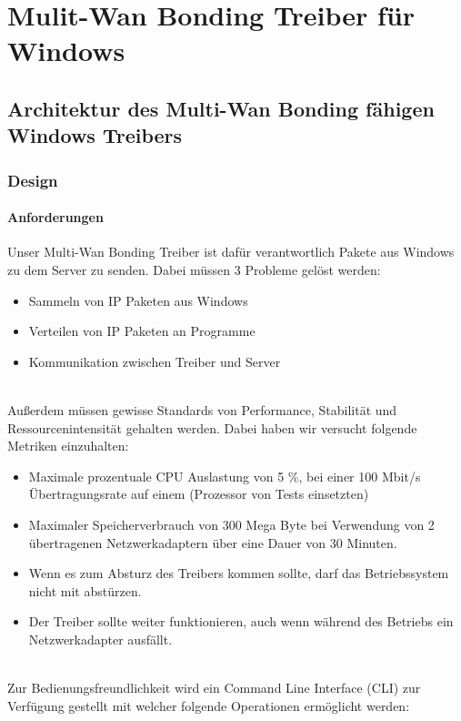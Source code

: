 \chapter{Mulit-Wan Bonding Treiber für Windows}
\label{chap:Treiber}

\section{Architektur des Multi-Wan Bonding fähigen Windows Treibers}
\subsection{Design}
\subsubsection{Anforderungen}
Unser Multi-Wan Bonding Treiber ist dafür verantwortlich Pakete aus Windows zu dem Server zu senden. Dabei müssen 3 Probleme gelöst werden:
\newline
\begin{itemize}
    \item Sammeln von IP Paketen aus Windows
    \item Verteilen von IP Paketen an Programme
    \item Kommunikation zwischen Treiber und Server
\end{itemize}
\ \\
Außerdem müssen gewisse Standards von Performance, Stabilität und Ressourcenintensität gehalten werden. Dabei haben wir versucht folgende Metriken einzuhalten:
\newline
\begin{itemize}
    \item Maximale prozentuale CPU Auslastung von 5 \%, bei einer 100 Mbit/s Übertragungsrate auf einem (Prozessor von Tests einsetzten)
    \item Maximaler Speicherverbrauch von 300 Mega Byte bei Verwendung von 2 übertragenen Netzwerkadaptern über eine Dauer von 30 Minuten.
    \item Wenn es zum Absturz des Treibers kommen sollte, darf das Betriebssystem nicht mit abstürzen.
    \item Der Treiber sollte weiter funktionieren, auch wenn während des Betriebs ein Netzwerkadapter ausfällt.
\end{itemize}
\ \\
Zur Bedienungsfreundlichkeit wird ein Command Line Interface (CLI)  zur Verfügung gestellt mit welcher folgende Operationen ermöglicht werden:
